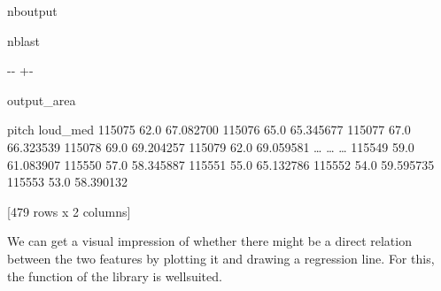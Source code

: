\documentclass[letterpaper,10pt,english]{sphinxmanual}
\newlength\nbsphinxcodecellspacing
\begin{document}
\begin{sphinxuseclass}{nboutput}
\begin{sphinxuseclass}{nblast}
{

\kern-\sphinxverbatimsmallskipamount\kern-\baselineskip
\kern+\FrameHeightAdjust\kern-\fboxrule
\vspace{\nbsphinxcodecellspacing}

\begin{sphinxuseclass}{output_area}
\begin{sphinxuseclass}{}


\begin{sphinxVerbatim}[commandchars=\\\{\}]
\llap{\color{nbsphinxout}[69]:\,\hspace{\fboxrule}\hspace{\fboxsep}}        pitch   loud\_med
115075   62.0  67.082700
115076   65.0  65.345677
115077   67.0  66.323539
115078   69.0  69.204257
115079   62.0  69.059581
{\ldots}       {\ldots}        {\ldots}
115549   59.0  61.083907
115550   57.0  58.345887
115551   55.0  65.132786
115552   54.0  59.595735
115553   53.0  58.390132

[479 rows x 2 columns]
\end{sphinxVerbatim}



\end{sphinxuseclass}
\end{sphinxuseclass}
}

\end{sphinxuseclass}
\end{sphinxuseclass}
\sphinxAtStartPar
We can get a visual impression of whether there might be a direct relation between the two features by plotting it and drawing a regression line. For this, the  function of the  library is well\sphinxhyphen{}suited.
\end{document}
